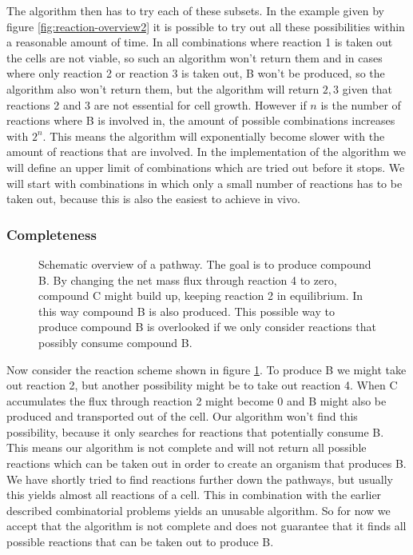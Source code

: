 \documentclass[12pt]{report}
\begin{document}
The algorithm then has to try each of these subsets.
In the example given by figure \ref{fig:reaction-overview2} it is possible to try out all these possibilities within a reasonable amount of time.
In all combinations where reaction 1 is taken out the cells are not viable, so such an algorithm won't return them and in cases where only reaction 2 or reaction 3 is taken out, B won't be produced, so the algorithm also won't return them, but the algorithm will return ${2,3}$ given that reactions 2 and 3 are not essential for cell growth.
However if $n$ is the number of reactions where B is involved in, the amount of possible combinations increases with $2^n$.
This means the algorithm will exponentially become slower with the amount of reactions that are involved.
In the implementation of the algorithm we will define an upper limit of combinations which are tried out before it stops. We will start with combinations in which only a small number of reactions has to be taken out, because this is also the easiest to achieve in vivo.

\subsubsection{Completeness}
\begin{figure}[hbtp]
  \centering
     
      \caption{Schematic overview of a pathway. The goal is to produce compound B. By changing the net mass flux through reaction 4 to zero, compound C might build up, keeping reaction 2 in equilibrium. In this way compound B is also produced. This possible way to produce compound B is overlooked if we only consider reactions that possibly consume compound B.}
  \label{fig:reaction-overview3}
\end{figure}
Now consider the reaction scheme shown in figure \ref{fig:reaction-overview3}.
To produce B we might take out reaction 2, but another possibility might be to take out reaction 4.
When C accumulates the flux through reaction 2 might become 0 and B might also be produced and transported out of the cell.
Our algorithm won't find this possibility, because it only searches for reactions that potentially consume B.
This means our algorithm is not complete and will not return all possible reactions which can be taken out in order to create an organism that produces B.
We have shortly tried to find reactions further down the pathways, but usually this yields almost all reactions of a cell.
This in combination with the earlier described combinatorial problems yields an unusable algorithm.
So for now we accept that the algorithm is not complete and does not guarantee that it finds all possible reactions that can be taken out to produce B.
\end{document}
